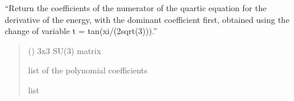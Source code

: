 \documentclass[letterpaper,10pt,english]{sphinxmanual}
\begin{document}
\begin{fulllineitems}
\label{\detokenize{numerical_reject:numerical_reject.coeffs_quartic}}
\pysigstartsignatures
\pysiglinewithargsret
{}
{}
{}
\pysigstopsignatures
\sphinxAtStartPar
“Return the coefficients of the numerator of the quartic equation for the derivative of the energy, with the dominant coefficient first, obtained using the change of variable t = tan(xi/(2sqrt(3))).”
\begin{quote}\begin{description}
\sphinxAtStartPar
{} () \textendash{} 3x3 SU(3) matrix

\sphinxAtStartPar
list of the polynomial coefficients

\sphinxAtStartPar
list

\end{description}\end{quote}

\end{fulllineitems}

\end{document}
